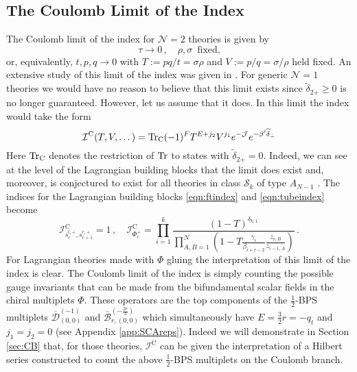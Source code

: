 \documentclass[main.tex]{subfiles}
\begin{document}
\subsection{The Coulomb Limit of the Index}
The Coulomb limit of the index for $\mathcal{N}=2$ theories is given by
\begin{equation}
\tau\to0\,,\quad \rho,\sigma\,\,\,\text{fixed,}
\end{equation}
or, equivalently, $t,p,q\to0$ with $T:=pq/t=\sigma\rho$ and $V:=p/q=\sigma/\rho$ held fixed. An extensive study of this limit of the index was given in \cite{Razamat:2018zus}. For generic $\mathcal{N}=1$ theories we would have no reason to believe that this limit exists since $\widetilde{\delta}_{2\dot+}\geq0$ is no longer guaranteed. However, let us assume that it does. In this limit the index would take the form
\begin{equation}\label{eqn:CoulombInd}
\mathcal{I}^{\text{C}}(T,V,\dots)=\operatorname{Tr}_{\text{C}}(-1)^FT^{E+j_2}V^{j_1}e^{-\mathcal{J}}e^{-\beta'\widetilde{\delta}_{\dot-}}
\end{equation} 
Here $\operatorname{Tr}_{\text{C}}$ denotes the restriction of $\operatorname{Tr}$ to states with $\widetilde{\delta}_{2\dot+}=0$. Indeed, we can see at the level of the Lagrangian building blocks that the limit does exist and, moreover, is conjectured to exist for all theories in class $\mathcal{S}_k$ of type $A_{N-1}$ \cite{Razamat:2018zus}. The indices for the Lagrangian building blocks \eqref{eqn:ftindex} and \eqref{eqn:tubeindex} become
\begin{equation}\label{eqn:CoulombBuild}
\mathcal{I}^{\text{C}}_{s_{c}^{l,+},s_{c+1}^{r,+}}=1\,,\quad \mathcal{I}^{\text{C}}_{\Phi^+_c}=\prod_{i=1}^k\frac{\left(1-T\right)^{\delta_{k,1}}}{\prod_{A,B=1}^N\left(1-T\frac{\gamma_i}{\beta_{i+c-2}}\frac{z_{i,B}}{z_{i-1,A}}\right)}\,.
\end{equation}
For Lagrangian theories made with $\Phi$ gluing the interpretation of this limit of the index is clear. The Coulomb limit of the index is simply counting the possible gauge invariants that can be made from the bifundamental scalar fields in the chiral multiplets $\Phi$. These operators are the top components of the $\frac{1}{2}$-BPS multiplets $\overline{\mathcal{D}}^{(-1)}_{(0,0)}$ and $\overline{\mathcal{B}}^{(-\frac{2r}{3})}_{r,(0,0)}$ which simultaneously have $E=\frac{3}{2}r=-q_t$ and $j_1=j_2=0$ (see Appendix \ref{app:SCAreps}). Indeed we will demonstrate in Section \ref{sec:CB} that, for those theories, $\mathcal{I}^{\text{C}}$ can be given the interpretation of a Hilbert series constructed to count the above $\frac{1}{2}$-BPS multiplets on the Coulomb branch.
\end{document}

